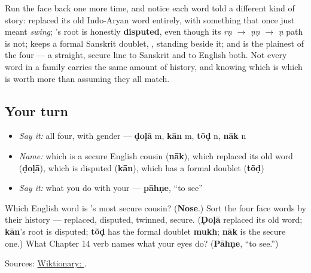 \begin{culture}
Run the face back one more time, and notice each word told a different kind of story: \textbf{} replaced its old Indo-Aryan word entirely, with something that once just meant \emph{swing}; \textbf{}'s root is honestly \textbf{disputed}, even though its \emph{rṇ} $\to$ \emph{ṇṇ} $\to$ \emph{ṇ} path is not; \textbf{} keeps a formal Sanskrit doublet, \textbf{}, standing beside it; and \textbf{} is the plainest of the four — a straight, secure line to Sanskrit and to English both. Not every word in a family carries the same amount of history, and knowing which is which is worth more than assuming they all match.
\end{culture}

\subsection*{Your turn}
\begin{itemize}
\raggedright
  \item \emph{Say it:} all four, with gender — \textbf{ḍoḷā} m, \textbf{kān} m, \textbf{tõḍ} n, \textbf{nāk} n
  \item \emph{Name:} which is a secure English cousin (\textbf{nāk}), which replaced its old word (\textbf{ḍoḷā}), which is disputed (\textbf{kān}), which has a formal doublet (\textbf{tõḍ})
  \item \emph{Say it:} what you do with your \textbf{} — \textbf{pāhṇe}, \textquotedblleft{}to see\textquotedblright{}
\end{itemize}

\begin{tcolorbox}[breakable,colback=teal!4,colframe=teal!35!black,title={Before you move on}]
Which English word is \textbf{}'s most secure cousin? (\textbf{Nose}.) Sort the four face words by their history — replaced, disputed, twinned, secure. (\textbf{Ḍoḷā} replaced its old word; \textbf{kān}'s root is disputed; \textbf{tõḍ} has the formal doublet \textbf{mukh}; \textbf{nāk} is the secure one.) What Chapter 14 verb names what your eyes do? (\textbf{Pāhṇe}, \textquotedblleft{}to see.\textquotedblright{})

Sources: \href{https://en.wiktionary.org/wiki/\%E0\%A4\%A8\%E0\%A4\%BE\%E0\%A4\%95}{Wiktionary: }.
\end{tcolorbox}
